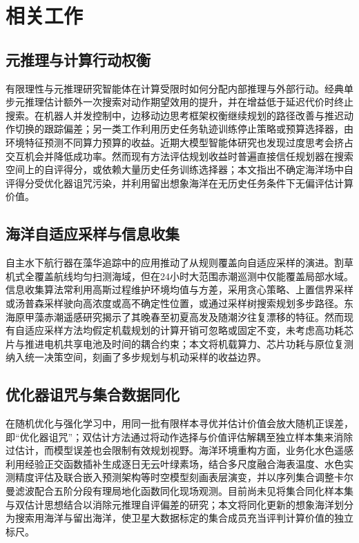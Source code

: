 \section{相关工作}

\subsection{元推理与计算行动权衡}

有限理性与元推理研究智能体在计算受限时如何分配内部推理与外部行动\cite{horvitz1987reasoning, russell1991right}。经典单步元推理估计额外一次搜索对动作期望效用的提升，并在增益低于延迟代价时终止搜索\cite{lin2015metareasoning}。在机器人并发控制中，边移动边思考框架权衡继续规划的路径改善与推迟动作切换的跟踪偏差\cite{xiao2020thinking, elboher2023formal}；另一类工作利用历史任务轨迹训练停止策略或预算选择器，由环境特征预测不同算力预算的收益\cite{sung2021quit, magnino2026metareasoning}。近期大模型智能体研究也发现过度思考会挤占交互机会并降低成功率\cite{shen2025thinking, cuadron2025overthinking, hunt2021formalizing}。然而现有方法评估规划收益时普遍直接信任规划器在搜索空间上的自评得分，或依赖大量历史任务训练选择器；本文指出不确定海洋场中自评得分受优化器诅咒污染，并利用留出想象海洋在无历史任务条件下无偏评估计算价值。

\subsection{海洋自适应采样与信息收集}

自主水下航行器在藻华追踪中的应用推动了从规则覆盖向自适应采样的演进\cite{fossum2019}。割草机式全覆盖航线均匀扫测海域\cite{galceran2013coverage}，但在24小时大范围赤潮巡测中仅能覆盖局部水域。信息收集算法常利用高斯过程维护环境均值与方差，采用贪心策略、上置信界采样\cite{srinivas2012gpucb}或汤普森采样\cite{russo2018thompson}驶向高浓度或高不确定性位置，或通过采样树搜索规划多步路径\cite{hollinger2014sampling}。东海原甲藻赤潮遥感研究揭示了其晚春至初夏高发及随潮汐往复漂移的特征\cite{lou2014diurnal, zhao2025distinguishing}。然而现有自适应采样方法均假定机载规划的计算开销可忽略或固定不变，未考虑高功耗芯片与推进电机共享电池及时间的耦合约束；本文将机载算力、芯片功耗与原位复测纳入统一决策空间，刻画了多步规划与机动采样的收益边界。

\subsection{优化器诅咒与集合数据同化}

在随机优化与强化学习中，用同一批有限样本寻优并估计价值会放大随机正误差，即“优化器诅咒”\cite{smith2006curse}；双估计方法通过将动作选择与价值评估解耦至独立样本集来消除过估计\cite{vanhasselt2010double}，而模型误差也会限制有效规划视野\cite{jiang2015horizon}。海洋环境重构方面，业务化水色遥感利用经验正交函数插补生成逐日无云叶绿素场\cite{beckers2003dineof}，结合多尺度融合海表温度\cite{chin2017mur}、水色实测精度评估\cite{ye2021cocts}及联合嵌入预测架构等时空模型\cite{assran2025vjepa2}刻画表层演变，并以序列集合调整卡尔曼滤波\cite{anderson2001eakf}配合五阶分段有理局地化函数\cite{gaspari1999correlation}同化现场观测。目前尚未见将集合同化样本集与双估计思想结合以消除元推理自评偏差的研究；本文将同化更新的想象海洋划分为搜索用海洋与留出海洋，使卫星大数据标定的集合成员充当评判计算价值的独立标尺。
